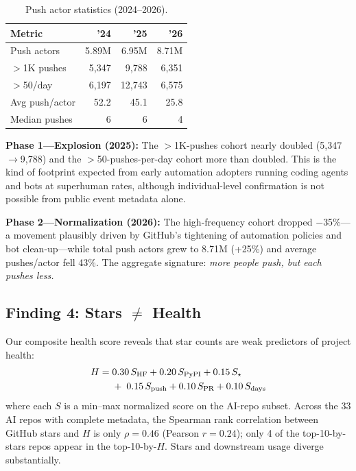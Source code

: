 \documentclass[11pt,twocolumn]{article}
\begin{document}
\begin{table}[t]
\centering\small
\caption{Push actor statistics (2024--2026).}\label{tab:agent-phases}
\begin{tabular}{@{}lrrr@{}}
\toprule
\textbf{Metric} & \textbf{'24} & \textbf{'25} & \textbf{'26} \\
\midrule
Push actors       & 5.89M & 6.95M & 8.71M \\
$>$1K pushes      & 5,347 & 9,788 & 6,351 \\
$>$50/day         & 6,197 & 12,743 & 6,575 \\
Avg push/actor    & 52.2  & 45.1  & 25.8 \\
Median pushes     & 6     & 6     & 4 \\
\bottomrule
\end{tabular}
\end{table}

\textbf{Phase 1---Explosion (2025):}
The $>$1K-pushes cohort nearly doubled (5{,}347$\rightarrow$9{,}788) and the $>$50-pushes-per-day cohort more than doubled. This is the kind of footprint expected from early automation adopters running coding agents and bots at superhuman rates, although individual-level confirmation is not possible from public event metadata alone.

\textbf{Phase 2---Normalization (2026):}
The high-frequency cohort dropped $-$35\%---a movement plausibly driven by GitHub's tightening of automation policies and bot clean-up---while total push actors grew to 8.71M (+25\%) and average pushes/actor fell 43\%.
The aggregate signature: \emph{more people push, but each pushes less.}

\subsection{Finding 4: Stars $\neq$ Health}\label{sec:stars}

Our composite health score reveals that star counts are weak predictors of project health:
\begin{align}\label{eq:health}
H = \;& 0.30\,S_{\text{HF}} + 0.20\,S_{\text{PyPI}} + 0.15\,S_{\star} \notag\\
      &+\; 0.15\,S_{\text{push}} + 0.10\,S_{\text{PR}} + 0.10\,S_{\text{days}}
\end{align}
where each $S$ is a min--max normalized score on the AI-repo subset.
Across the 33 AI repos with complete metadata, the Spearman rank correlation between GitHub stars and $H$ is only $\rho = 0.46$ (Pearson $r = 0.24$); only 4 of the top-10-by-stars repos appear in the top-10-by-$H$. Stars and downstream usage diverge substantially.
\end{document}
